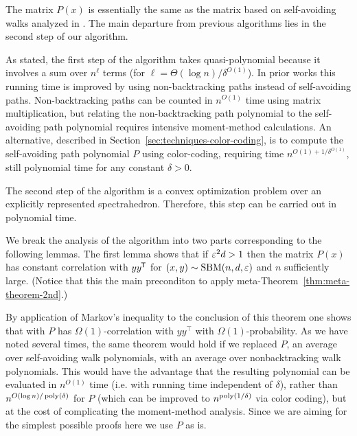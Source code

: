 The matrix $P(x)$ is essentially the same as the matrix based on self-avoiding walks analyzed in \cite{DBLP:journals/corr/MosselNS13a}.
The main departure from previous algorithms lies in the second step of our algorithm.

As stated, the first step of the algorithm takes quasi-polynomial because it involves a sum over $n^\ell$ terms (for $\ell=\Theta(\log n)/\delta^{O(1)}$).
In prior works this running time is improved by using non-backtracking paths instead of self-avoiding paths.
Non-backtracking paths can be counted in $n^{O(1)}$ time using matrix multiplication, but relating the non-backtracking path polynomial to the self-avoiding path polynomial requires intensive moment-method calculations.
An alternative, described in Section~\ref{sec:techniques-color-coding}, is to compute the self-avoiding path polynomial $P$ using color-coding, requiring time $n^{O(1) + 1/\delta^{O(1)}}$, still polynomial time for any constant $\delta > 0$.

The second step of the algorithm is a convex optimization problem over an explicitly represented spectrahedron.
Therefore, this step can be carried out in polynomial time.

We break the analysis of the algorithm into two parts corresponding to the following lemmas.
The first lemma shows that if $\varepsilon^2 d > 1$ then the matrix $P(x)$ has constant correlation with $yy{}^{\mkern-1.5mu\mathsf{T}}$ for $(x,y)\sim \mathrm{SBM}(n,d,\varepsilon)$ and $n$ sufficiently large.
(Notice that this the main preconditon to apply meta-Theorem~\ref{thm:meta-theorem-2nd}.)

By application of Markov's inequality to the conclusion of this theorem one shows that with $P$ has $\Omega(1)$-correlation with $yy^\top$ with $\Omega(1)$-probability.
As we have noted several times, the same theorem would hold if we replaced $P$, an average over self-avoiding walk polynomials, with an average over nonbacktracking walk polynomials.
This would have the advantage that the resulting polynomial can be evaluated in $n^{O(1)}$ time (i.e. with running time independent of $\delta$), rather than $n^{O(\log n)/\operatorname{poly}(\delta)}$ for $P$ (which can be improved to $n^{\operatorname{poly}(1/\delta)}$ via color coding), but at the cost of complicating the moment-method analysis.
Since we are aiming for the simplest possible proofs here we use $P$ as is.


